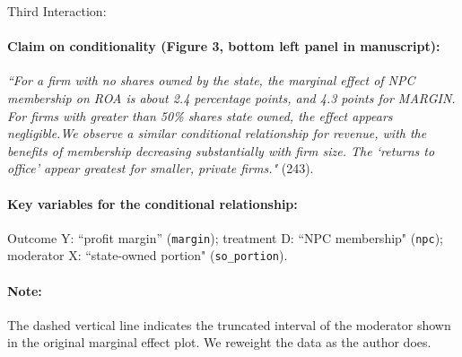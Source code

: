 \documentclass[12pt]{article}
\begin{document}
\clearpage

\noindent Third Interaction:

\paragraph{Claim on conditionality (Figure 3, bottom left panel in manuscript):} \emph{``For a firm with no shares owned by the state, the marginal effect of NPC membership on ROA is about 2.4 percentage points, and 4.3 points for MARGIN. For firms with greater than 50\% shares state owned, the effect appears negligible.We observe a similar conditional relationship for revenue, with the benefits of membership decreasing substantially with firm size. The `returns to office' appear greatest for smaller, private firms."} (243). 

\paragraph{Key variables for the conditional relationship:} Outcome Y:
``profit margin'' (\texttt{margin}); treatment D: ``NPC membership" (\texttt{npc}); moderator X: ``state-owned portion"
(\texttt{so\_portion}).

\paragraph{Note:} The dashed vertical line indicates the truncated
interval of the moderator shown in the original marginal effect plot. We reweight the data as the author does.


\newpage
\end{document}
